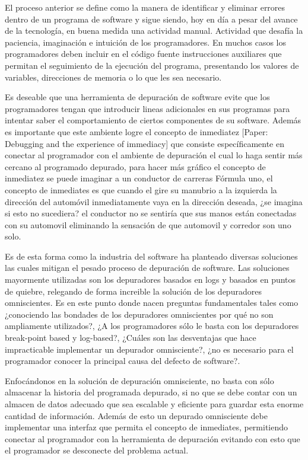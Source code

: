 \documentclass[12pt,legalpaper]{report}
\begin{document}
El proceso anterior se define como la manera de identificar y eliminar errores dentro de un programa de software y sigue siendo, hoy en día a pesar del avance de la tecnología, en buena medida una actividad manual.  Actividad que desafía la paciencia, imaginación e intuición de los programadores.  En muchos casos los programadores deben incluir en el código fuente instrucciones auxiliares que permitan el seguimiento de la ejecución del programa, presentando los valores de variables, direcciones de memoria o lo que les sea necesario.

Es deseable que una herramienta de depuración de software evite que los programadores tengan que introducir lineas adicionales en sus programas para intentar saber el comportamiento de ciertos componentes de su software.  Además es importante que este ambiente logre el concepto de inmediatez [Paper: Debugging and the experience of immediacy] que consiste específicamente en conectar al programador con el ambiente de depuración el cual lo haga sentir más cercano al programado depurado, para hacer más gráfico el concepto de inmediatez se puede imaginar a un conductor de carreras Fórmula uno, el concepto de inmediates es que cuando el gire su manubrio a la izquierda la dirección del automóvil inmediatamente vaya en la dirección deseada, ¿se imagina si esto no sucediera? el conductor no se sentiría que sus manos están conectadas con su automovil eliminando la sensación de que automovil y corredor son uno solo.

Es de esta forma como la industria del software ha planteado diversas soluciones las cuales mitigan el pesado proceso de depuración de software.  Las soluciones mayormente utilizadas son los depuradores basados en logs y basados en puntos de quiebre, relegando de forma increible la solución de los depuradores omniscientes.  Es en este punto donde nacen preguntas fundamentales tales como ¿conociendo las bondades de los depuradores omniscientes por qué no son ampliamente utilizados?, ¿A los programadores sólo le basta con los depuradores break-point based y log-based?, ¿Cuáles son las desventajas que hace impracticable implementar un depurador omnisciente?, ¿no es necesario para el programador conocer la principal causa del defecto de software?.

Enfocándonos en la solución de depuración omnisciente, no basta con sólo almacenar la historia del programada depurado, si no que se debe contar con un almacen de datos adecuado que sea escalable y eficiente para guardar esta enorme cantidad de información.  Además de esto un depurado omnisciente debe implementar una interfaz que permita el concepto de inmediates, permitiendo conectar al programador con la herramienta de depuración evitando con esto que el programador se desconecte del problema actual.
\end{document}
